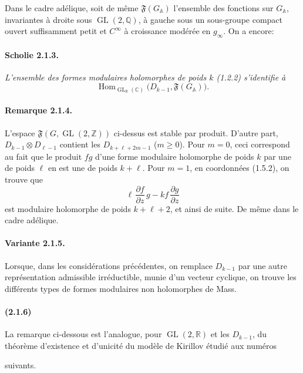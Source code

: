 \documentclass[10pt,a4paper]{article}
\providecommand{\GL}{\operatorname{GL}}
\providecommand{\Hom}{\operatorname{Hom}}
\providecommand{\R}{\mathbb R}
\providecommand{\Q}{\mathbb Q}
\providecommand{\Z}{\mathbb Z}
\providecommand{\C}{\mathbb C}
\begin{document}
Dans le cadre adélique, soit de même \(\mathfrak F(G_{\mathbb A})\) l'ensemble des fonctions sur \(G_{\mathbb A}\), invariantes à droite sous \(\GL(2,\Q)\), à gauche sous un sous-groupe compact ouvert suffisamment petit et \(C^\infty\) à croissance modérée en \(g_\infty\). On a encore:

\paragraph{Scholie 2.1.3.}{\itshape  L'ensemble des formes modulaires holomorphes de poids \(k\) (1.2.2) s'identifie à
\[
\Hom_{\GL_{\R}(\C)}\bigl(D_{k-1},\mathfrak F(G_{\mathbb A})\bigr).
\]

\par}
\paragraph{Remarque 2.1.4.} L'espace \(\mathfrak F(G,\GL(2,\Z))\) ci-dessus est stable par produit. D'autre part, \(D_{k-1}\otimes D_{\ell-1}\) contient les \(D_{k+\ell+2m-1}\) (\(m\ge0\)). Pour \(m=0\), ceci correspond au fait que le produit \(fg\) d'une forme modulaire holomorphe de poids \(k\) par une de poids \(\ell\) en est une de poids \(k+\ell\). Pour \(m=1\), en coordonnées (1.5.2), on trouve que
\[
\ell\,\frac{\partial f}{\partial z}\,g-kf\,\frac{\partial g}{\partial z}
\]
est modulaire holomorphe de poids \(k+\ell+2\), et ainsi de suite. De même dans le cadre adélique.

\paragraph{Variante 2.1.5.} Lorsque, dans les considérations précédentes, on remplace \(D_{k-1}\) par une autre représentation admissible irréductible, munie d'un vecteur cyclique, on trouve les différents types de formes modulaires non holomorphes de Mass.

\paragraph{(2.1.6)} La remarque ci-dessous est l'analogue, pour \(\GL(2,\R)\) et les \(D_{k-1}\), du théorème d'existence et d'unicité du modèle de Kirillov étudié aux numéros

\clearpage
{}
\hypertarget{authority-24}{}
suivants.
\end{document}
